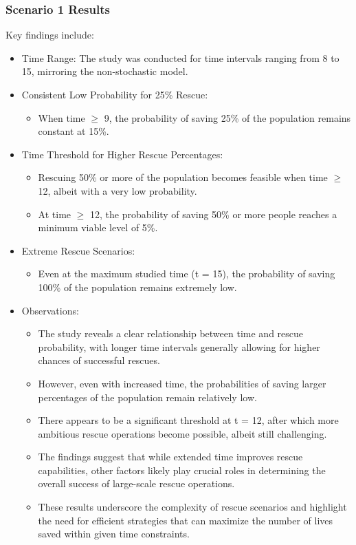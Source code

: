 \subsubsection{Scenario 1 Results}
Key findings include:

\begin{itemize}
	\item Time Range: The study was conducted for time intervals ranging from 8 to 15, mirroring the non-stochastic model.
	\item Consistent Low Probability for 25\% Rescue:
	\begin{itemize}
		\item When time $\ge$ 9, the probability of saving 25\% of the population remains constant at 15\%.
	\end{itemize}
	\item Time Threshold for Higher Rescue Percentages:
	\begin{itemize}
		\item Rescuing 50\% or more of the population becomes feasible when time $\ge$ 12, albeit with a very low probability.
		\item At time $\ge$ 12, the probability of saving 50\% or more people reaches a minimum viable level of 5\%.
	\end{itemize}
	\item Extreme Rescue Scenarios:
	\begin{itemize}
		\item Even at the maximum studied time (t = 15), the probability of saving 100\% of the population remains extremely low.
	\end{itemize}
\end{itemize}

\begin{itemize}
	\item Observations:
	\begin{itemize}
		\item The study reveals a clear relationship between time and rescue probability, with longer time intervals generally allowing for higher chances of successful rescues.
		\item However, even with increased time, the probabilities of saving larger percentages of the population remain relatively low.
		\item There appears to be a significant threshold at t = 12, after which more ambitious rescue operations become possible, albeit still challenging.
		\item The findings suggest that while extended time improves rescue capabilities, other factors likely play crucial roles in determining the overall success of large-scale rescue operations.
		\item These results underscore the complexity of rescue scenarios and highlight the need for efficient strategies that can maximize the number of lives saved within given time constraints.
	\end{itemize}
\end{itemize}

